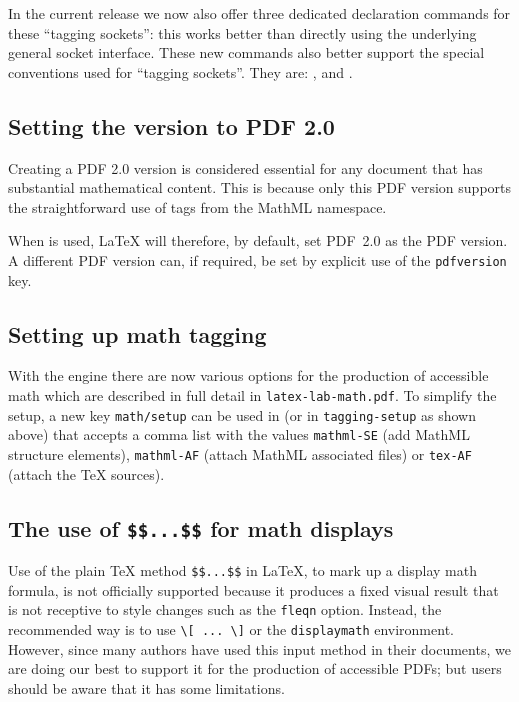 \documentclass{ltnews}
\providecommand\env[1]{\texttt{#1}}
\providecommand\LuaTeX{\hologo{LuaTeX}}
\providecommand\env[1]{\texttt{#1}}
\begin{document}
In the current release we now also offer three dedicated declaration
commands for these \enquote{tagging sockets}: this works better than
directly using the underlying general socket interface.  These new
commands also better support the special conventions used for
\enquote{tagging sockets}. They are: ,
 and .


\subsection{Setting the version to PDF 2.0}

Creating a PDF 2.0 version is considered essential for any document
that has substantial mathematical content.  This is because only this
PDF version supports the straightforward use of tags from the MathML
namespace.

When  is used, \LaTeX{} will therefore, by
default, set PDF~2.0 as the PDF version.  A different PDF version can,
if required, be set by explicit use of the \texttt{pdfversion} key.




\subsection{Setting up math tagging}

With the \LuaTeX{} engine there are now various options for the
production of accessible math which are described in full detail in
\texttt{latex-lab-math.pdf}. To simplify the setup, a new key
\texttt{math/setup} can be used in  (or in
\texttt{tagging-setup} as shown above) that accepts a comma list with
the values \texttt{mathml-SE} (add MathML structure elements),
\texttt{mathml-AF} (attach MathML associated files) or \texttt{tex-AF}
(attach the \TeX{} sources).


\subsection{The use of \texttt{\$\$...\$\$} for math displays}

Use of the plain \TeX{} method \verb=$$...$$= in \LaTeX{}, to mark up
a display math formula, is not officially supported because it
produces a fixed visual result that is not receptive to style changes
such as the \texttt{fleqn} option. Instead, the recommended way is to
use \verb=\[ ... \]= or the \env{displaymath} environment. However,
since many authors have used this input method in their documents, we
are doing our best to support it for the production of accessible
PDFs; but users should be aware that it has some limitations.
\end{document}
